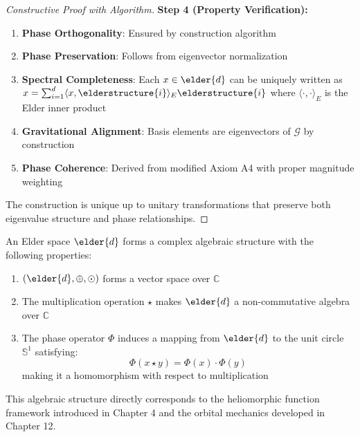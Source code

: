 \begin{proof}[Constructive Proof with Algorithm]
\textbf{Step 4 (Property Verification):}
\begin{enumerate}
    \item \textbf{Phase Orthogonality}: Ensured by construction algorithm
    \item \textbf{Phase Preservation}: Follows from eigenvector normalization
    \item \textbf{Spectral Completeness}: Each $x \in \elder{d}$ can be uniquely written as $x = \sum_{i=1}^{d} \langle x, \elderstructure{i} \rangle_E \elderstructure{i}$ where $\langle \cdot, \cdot \rangle_E$ is the Elder inner product
    \item \textbf{Gravitational Alignment}: Basis elements are eigenvectors of $\mathcal{G}$ by construction
    \item \textbf{Phase Coherence}: Derived from modified Axiom A4 with proper magnitude weighting
\end{enumerate}

The construction is unique up to unitary transformations that preserve both eigenvalue structure and phase relationships.
\end{proof}

\begin{corollary}
An Elder space $\elder{d}$ forms a complex algebraic structure with the following properties:
\begin{enumerate}
    \item $(\elder{d}, \oplus, \odot)$ forms a vector space over $\mathbb{C}$
    \item The multiplication operation $\star$ makes $\elder{d}$ a non-commutative algebra over $\mathbb{C}$
    \item The phase operator $\Phi$ induces a mapping from $\elder{d}$ to the unit circle $\mathbb{S}^1$ satisfying:
    \begin{equation}
        \Phi(x \star y) = \Phi(x) \cdot \Phi(y)
    \end{equation}
    making it a homomorphism with respect to multiplication
\end{enumerate}
This algebraic structure directly corresponds to the heliomorphic function framework introduced in Chapter 4 and the orbital mechanics developed in Chapter 12.
\end{corollary}

